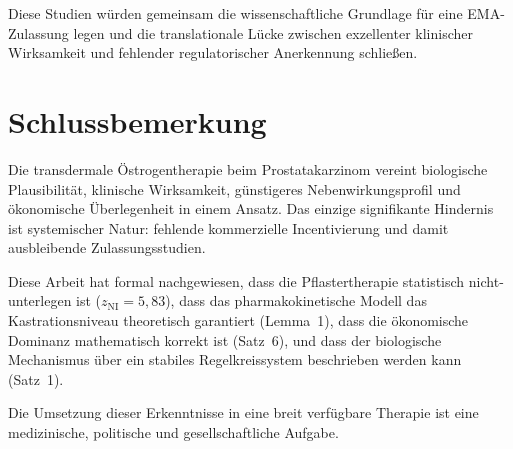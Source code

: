 ﻿\documentclass[a4paper,12pt]{article}
\theoremstyle{definition}
\begin{document}
Diese Studien würden gemeinsam die wissenschaftliche Grundlage für eine EMA-Zulassung legen und die translationale Lücke zwischen exzellenter klinischer Wirksamkeit und fehlender regulatorischer Anerkennung schließen.

\section{Schlussbemerkung}

Die transdermale Östrogentherapie beim Prostatakarzinom vereint biologische Plausibilität, klinische Wirksamkeit, günstigeres Nebenwirkungsprofil und ökonomische Überlegenheit in einem Ansatz.
Das einzige signifikante Hindernis ist systemischer Natur: fehlende kommerzielle Incentivierung und damit ausbleibende Zulassungsstudien.

Diese Arbeit hat formal nachgewiesen, dass die Pflastertherapie statistisch nicht-unterlegen ist ($z_{\mathrm{NI}} = 5{,}83$), dass das pharmakokinetische Modell das Kastrationsniveau theoretisch garantiert (Lemma~1), dass die ökonomische Dominanz mathematisch korrekt ist (Satz~6), und dass der biologische Mechanismus über ein stabiles Regelkreissystem beschrieben werden kann (Satz~1).

Die Umsetzung dieser Erkenntnisse in eine breit verfügbare Therapie ist eine medizinische, politische und gesellschaftliche Aufgabe.
\end{document}
